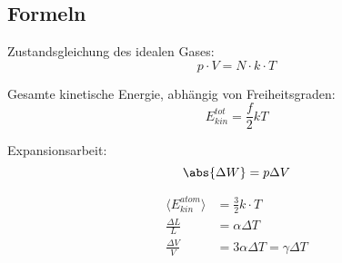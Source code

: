 \documentclass[11pt,letterpaper]{article}
\begin{document}
{{{}


 \subsection{Formeln}{

    Zustandsgleichung des idealen Gases:
    \begin{equation*}
        p\cdot V = N\cdot k\cdot T
    \end{equation*}

    Gesamte kinetische Energie, abhängig von Freiheitsgraden:
    \begin{equation*}
        E_{kin}^{tot} = \frac{f}{2} k T
    \end{equation*}

    Expansionsarbeit:
    \begin{equation*}
        \abs{\Delta W} = p\Delta V
    \end{equation*}

    \begin{align*}
        \langle E_{kin}^{atom}\rangle&=\frac{3}{2}k\cdot T \\
        \frac{\Delta L}{L}&=\alpha \Delta T\\
        \frac{\Delta V}{V} &= 3 \alpha \Delta T = \gamma \Delta T\\
    \end{align*}

}}}
\end{document}
